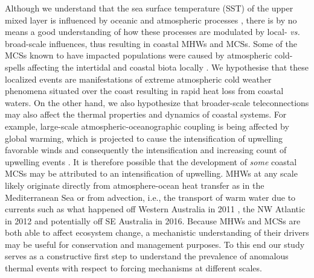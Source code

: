 \documentclass[a4paper,10pt,review]{elsarticle}
\begin{document}
Although we understand that the sea surface temperature (SST) of the upper mixed layer is influenced by oceanic and atmospheric processes \citep[see Equation 1 of][]{Deser2010}, there is by no means a good understanding of how these processes are modulated by local- \emph{vs.} broad-scale influences, thus resulting in coastal MHWs and MCSs. Some of the MCSs known to have impacted populations were caused by atmospheric cold-spells affecting the intertidal and coastal biota locally \citep{Gunter1941, Firth2011}. We hypothesise that these localized events are manifestations of extreme atmospheric cold weather phenomena situated over the coast resulting in rapid heat loss from coastal waters. On the other hand, we also hypothesize that broader-scale teleconnections may also affect the thermal properties and dynamics of coastal systems. For example, large-scale atmospheric-oceanographic coupling is being affected by global warming, which is projected to cause the intensification of upwelling favorable winds and consequently the intensification and increasing count of upwelling events \citep[see][for a review of this and alternative hypotheses]{Garcia-Reyes2015}. It is therefore possible that the development of \emph{some} coastal MCSs may be attributed to an intensification of upwelling. MHWs at any scale likely originate directly from atmosphere-ocean heat transfer as in the Mediterranean Sea \citep[e.g.][]{Garrabou2009} or from advection, i.e., the transport of warm water due to currents such as what happened off Western Australia in 2011 \citep{Feng2013, Benthuysen2014}, the NW Atlantic in 2012 \citep{Mills2012, Chen2014, Chen2015} and potentially off SE Australia in 2016. Because MHWs and MCSs are both able to affect ecosystem change, a mechanistic understanding of their drivers may be useful for conservation and management purposes. To this end our study serves as a constructive first step to understand the prevalence of anomalous thermal events with respect to forcing mechanisms at different scales.
\end{document}
